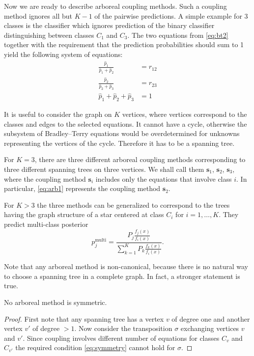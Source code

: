 Now we are ready to describe  arboreal coupling methods. Such a coupling method ignores all but $K-1$ of the pairwise predictions. A simple example for 3 classes is the classifier which ignores prediction of the binary classifier distinguishing between classes $C_1$ and $C_3$. The two equations from \eqref{eq:bt2} together with the requirement that the prediction probabilities should sum to 1 yield the following system of equations:
\begin{equation}
	\begin{split}
		\frac{\hat p_1}{\hat p_1 + \hat p_2} &= {r}_{12}\\
		\frac{\hat p_2}{\hat p_2 + \hat p_3} &= {r}_{23}\\
		\hat p_1 + \hat p_2 + \hat p_3 &= 1
	\end{split}
	\label{eq:arb1}
\end{equation}

It is useful to consider the graph on $K$ vertices, where vertices correspond to the classes and edges to the selected equations. It cannot have a cycle, otherwise the subsystem of Bradley--Terry equations would be overdetermined for unknowns representing the vertices of the cycle. Therefore it has to be a spanning tree.

For $K=3$, there are three different arboreal coupling methods corresponding to three different spanning trees on three vertices.
We shall call them $\boldsymbol{s}_1$, $\boldsymbol{s}_2$, $\boldsymbol{s}_3$, where the coupling method $\boldsymbol{s}_i$ 
includes only the equations that involve class $i$. 
In particular, \eqref{eq:arb1} represents the coupling method $\boldsymbol{s}_2$.

For $K>3$ the three methods can be generalized to correspond to the trees having the graph structure  of a star centered at class $C_i$ for $i=1, \ldots, K$. They predict multi-class posterior
$$
p_j^\textrm{multi} = \frac{P_j \frac{f_j(x)}{f_i(x)}}{\sum_{k=1}^K P_k \frac{f_k(x)}{f_i(x)}}.
$$


Note that any arboreal method is non-canonical, because there is no natural way to choose a spanning tree in a complete graph. 
In fact, a stronger statement is true.
\begin{prop}
No arboreal method is symmetric. 
\end{prop}
\begin{proof}
First note that any spanning tree has a vertex $v$ of degree one and another vertex $v'$ of degree $>1$. Now consider the transposition $\sigma$ exchanging  vertices $v$  and $v'$. Since coupling involves different number of equations for classes $C_v$ and $C_{v'}$ the required condition \eqref{eq:symmetry} cannot hold for $\sigma$.
\end{proof}


